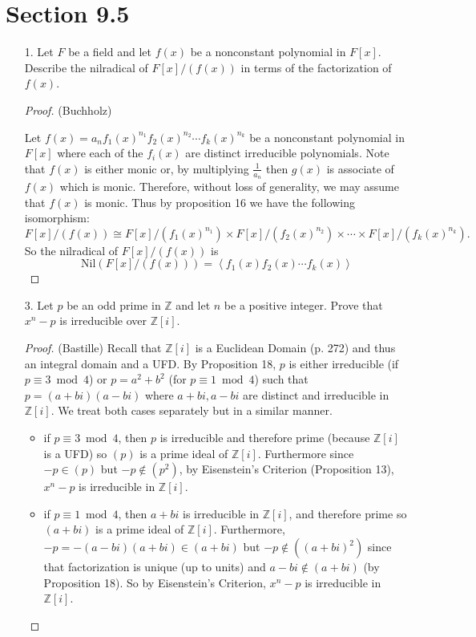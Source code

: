 \documentclass[10pt]{article}
\newcommand{\Z}{\mathbb{Z}}
\begin{document}
\section*{Section 9.5}

\begin{itemize}

\item[1.] Let $F$ be a field and let $f(x)$ be a nonconstant polynomial in $F[x]$.  Describe the nilradical of $F[x]/(f(x))$ in terms of the factorization of $f(x)$.

\begin{proof}(Buchholz)

Let $f(x)=a_n f_1(x)^{n_1} f_2(x)^{n_2}\cdots f_k(x)^{n_k}$ be a nonconstant polynomial in $F[x]$ where each of the $f_i(x)$ are distinct irreducible polynomials. Note that $f(x)$ is either monic or, by multiplying $\frac{1}{a_n}$  then $g(x)$ is associate of $f(x)$ which is monic.  Therefore, without loss
of generality, we may assume that $f(x)$ is monic.   Thus by proposition 16 we have the following isomorphism:
$$F[x]/(f(x))\cong F[x]/(f_1(x)^{n_1})\times F[x]/(f_2(x)^{n_2})\times \cdots \times F[x]/(f_k(x)^{n_k}).$$
So the nilradical of $F[x]/(f(x))$ is
$$\text{Nil}(F[x]/(f(x)))=\left<f_1(x)f_2(x)\cdots f_k(x)\right>$$
\end{proof}



\item[3.] Let $p$ be an odd prime in $\Z$ and let $n$ be a positive integer. Prove that $x^n-p$ is irreducible over $\Z[i]$.
\begin{proof} (Bastille) Recall that $\Z[i]$ is a Euclidean Domain (p. 272) and thus an integral domain and a UFD. By Proposition 18, $p$ is either irreducible (if $p \equiv 3 \bmod 4$) or $p=a^2+b^2$ (for $p \equiv 1 \bmod 4$) such that $p=(a+bi)(a-bi)$ where $a+bi, a-bi$ are distinct and irreducible in $\Z[i]$. We treat both cases separately but in a similar manner.
\begin{itemize}
\item if $p \equiv 3 \bmod 4$, then $p$ is irreducible and therefore prime (because $\Z[i]$ is a UFD) so $(p)$ is a prime ideal of $\Z[i]$. Furthermore since $-p \in (p)$ but $-p \notin (p^2)$, by Eisenstein's Criterion (Proposition 13), $x^n-p$ is irreducible in $\Z[i]$.
\item if $p \equiv 1 \bmod 4$, then $a+bi$ is irreducible in $\Z[i]$, and therefore prime so $(a+bi)$ is a prime ideal of $\Z[i]$. Furthermore, $-p=-(a-bi)(a+bi) \in (a+bi)$ but $-p \notin ((a+bi)^2)$ since that factorization is unique (up to units) and $a-bi \notin (a+bi)$ (by Proposition 18). So by Eisenstein's Criterion, $x^n-p$ is irreducible in $\Z[i]$.
\end{itemize}
\end{proof}

\end{itemize}
\end{document}

